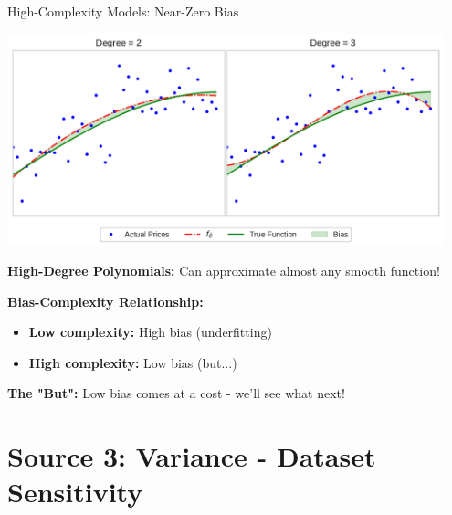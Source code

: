\documentclass[10pt]{beamer}
\newcommand{\fitpic}[1]{\begin{adjustbox}{max width=\linewidth, max totalheight=0.78\textheight}#1\end{adjustbox}}
\begin{document}
\begin{frame}{High-Complexity Models: Near-Zero Bias}
\begin{center}
\fitpic{\includegraphics[width=0.95\textwidth]{../assets/bias-variance/figures/bias8.pdf}}
\end{center}

\begin{alertbox}
\textbf{High-Degree Polynomials:} Can approximate almost any smooth function!
\end{alertbox}

\begin{definitionbox}
\textbf{Bias-Complexity Relationship:}
\begin{itemize}
\item \textbf{Low complexity:} High bias (underfitting)
\item \textbf{High complexity:} Low bias (but...)
\end{itemize}
\end{definitionbox}

\begin{keypointsbox}
\textbf{The "But":} Low bias comes at a cost - we'll see what next!
\end{keypointsbox}
\end{frame}

\section{Source 3: Variance - Dataset Sensitivity}
\end{document}
